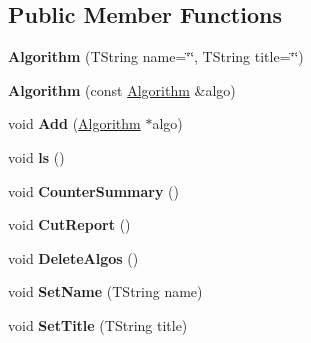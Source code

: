 \subsection*{Public Member Functions}
\begin{DoxyCompactItemize}
\item 
\hypertarget{class_h_a_l_1_1_algorithm_a50506c07b5959ecd740f5683bf50ea93}{{\bfseries Algorithm} (T\-String name=\char`\"{}\char`\"{}, T\-String title=\char`\"{}\char`\"{})}\label{class_h_a_l_1_1_algorithm_a50506c07b5959ecd740f5683bf50ea93}

\item 
\hypertarget{class_h_a_l_1_1_algorithm_a77b66292cc2f8e021ed819daebbd7c51}{{\bfseries Algorithm} (const \hyperlink{class_h_a_l_1_1_algorithm}{Algorithm} \&algo)}\label{class_h_a_l_1_1_algorithm_a77b66292cc2f8e021ed819daebbd7c51}

\item 
\hypertarget{class_h_a_l_1_1_algorithm_a6e6834d936897cd573ce858d9b26150e}{void {\bfseries Add} (\hyperlink{class_h_a_l_1_1_algorithm}{Algorithm} $\ast$algo)}\label{class_h_a_l_1_1_algorithm_a6e6834d936897cd573ce858d9b26150e}

\item 
\hypertarget{class_h_a_l_1_1_algorithm_aaadc2f897f854c3808753fe8bdc88507}{void {\bfseries ls} ()}\label{class_h_a_l_1_1_algorithm_aaadc2f897f854c3808753fe8bdc88507}

\item 
\hypertarget{class_h_a_l_1_1_algorithm_ac6dda46e3df39cc169aaf95ced0507df}{void {\bfseries Counter\-Summary} ()}\label{class_h_a_l_1_1_algorithm_ac6dda46e3df39cc169aaf95ced0507df}

\item 
\hypertarget{class_h_a_l_1_1_algorithm_ae989038537a82ae182821bf32036a15b}{void {\bfseries Cut\-Report} ()}\label{class_h_a_l_1_1_algorithm_ae989038537a82ae182821bf32036a15b}

\item 
\hypertarget{class_h_a_l_1_1_algorithm_a5a25656c41939992b7a701f9f6c22476}{void {\bfseries Delete\-Algos} ()}\label{class_h_a_l_1_1_algorithm_a5a25656c41939992b7a701f9f6c22476}

\item 
\hypertarget{class_h_a_l_1_1_algorithm_a7815cd340c0800cd2b5567814bbcc40a}{void {\bfseries Set\-Name} (T\-String name)}\label{class_h_a_l_1_1_algorithm_a7815cd340c0800cd2b5567814bbcc40a}

\item 
\hypertarget{class_h_a_l_1_1_algorithm_aa225c7fa0c6fdef7a2807c3eaa225d83}{void {\bfseries Set\-Title} (T\-String title)}\label{class_h_a_l_1_1_algorithm_aa225c7fa0c6fdef7a2807c3eaa225d83}


\end{DoxyCompactItemize}
